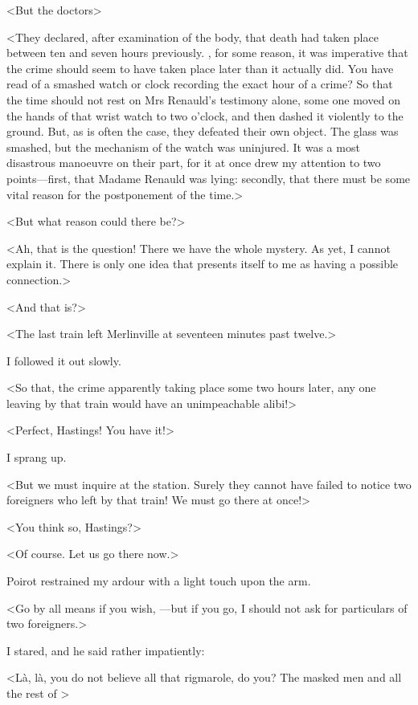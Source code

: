  <But the doctors\longdash> 

 <They declared, after examination of the body, that death had taken place between ten and seven hours previously. , for some reason, it was imperative that the crime should seem to have taken place later than it actually did. You have read of a smashed watch or clock recording the exact hour of a crime? So that the time should not rest on Mrs Renauld's testimony alone, some one moved on the hands of that wrist watch to two o'clock, and then dashed it violently to the ground. But, as is often the case, they defeated their own object. The glass was smashed, but the mechanism of the watch was uninjured. It was a most disastrous manoeuvre on their part, for it at once drew my attention to two points—first, that Madame Renauld was lying: secondly, that there must be some vital reason for the postponement of the time.> 

 <But what reason could there be?> 

 <Ah, that is the question! There we have the whole mystery. As yet, I cannot explain it. There is only one idea that presents itself to me as having a possible connection.> 

 <And that is?> 

 <The last train left Merlinville at seventeen minutes past twelve.> 

 I followed it out slowly. 

 <So that, the crime apparently taking place some two hours later, any one leaving by that train would have an unimpeachable alibi!> 

 <Perfect, Hastings! You have it!> 

 I sprang up. 

 <But we must inquire at the station. Surely they cannot have failed to notice two foreigners who left by that train! We must go there at once!> 

 <You think so, Hastings?> 

 <Of course. Let us go there now.> 

 Poirot restrained my ardour with a light touch upon the arm. 

 <Go by all means if you wish, —but if you go, I should not ask for particulars of two foreigners.> 

 I stared, and he said rather impatiently: 

 <Là, là, you do not believe all that rigmarole, do you? The masked men and all the rest of > 


